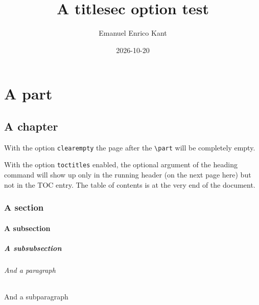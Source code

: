 \documentclass[twoside]{book}
\begin{document}
\title{A titlesec option test}
\author{Emanuel Enrico Kant}
\date{2026-10-20}

\maketitle

\part{A part}

\chapter[Testing the \texttt{toctitles} option (or not)]{A chapter}

With the option \texttt{clearempty} the page after the \verb=\part=
will be completely empty.

With the option \texttt{toctitles} enabled, the optional argument of
the heading command will show up only in the running header (on the
next page here) but not in the TOC entry. The table of contents is at the
very end of the document.

\kant[1][1-2]

\section{A section}

\kant[2][1-2]

\subsection{A subsection}

\kant[3][1-2]

\subsubsection{A subsubsection}

\kant[4][1-2]

\paragraph{And a paragraph}

\kant[5][1-2]

\subparagraph{And a subparagraph}

\kant[6][1-2]


\tableofcontents
\end{document}
